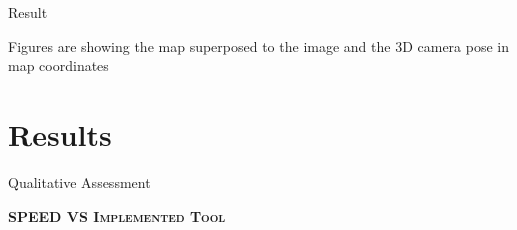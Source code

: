 \documentclass[10pt]{beamer}
\begin{document}
\begin{frame}{Result}
   \vspace{-0.2cm}

  Figures are showing the map superposed to the image and the 3D camera pose in map coordinates

\end{frame}

\section{Results}
\begin{frame}[plain]{}
  \sectionpage
\end{frame}

\begin{frame}{Qualitative Assessment}

  \bigskip

  \textsc{\textbf{\large SPEED VS Implemented Tool}}

  \bigskip


\end{frame}
\end{document}
